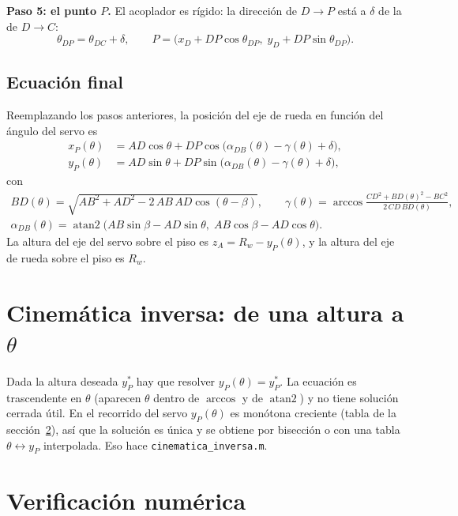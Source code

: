 \documentclass[11pt,a4paper]{article}
\newcommand{\atan}{\operatorname{atan2}}
\begin{document}
\textbf{Paso 5: el punto \(P\).} El acoplador es rígido: la dirección de \(D\!\to\!P\) está a \(\delta\)
de la de \(D\!\to\!C\):
\begin{equation}
\theta_{DP}=\theta_{DC}+\delta,\qquad
P=\bigl(x_D+DP\cos\theta_{DP},\;y_D+DP\sin\theta_{DP}\bigr).
\end{equation}

\subsection*{Ecuación final}

Reemplazando los pasos anteriores, la posición del eje de rueda en función del ángulo del servo es
\begin{equation}
\boxed{\;
\begin{aligned}
x_P(\theta)&=AD\cos\theta+DP\cos\bigl(\alpha_{DB}(\theta)-\gamma(\theta)+\delta\bigr),\\[2pt]
y_P(\theta)&=AD\sin\theta+DP\sin\bigl(\alpha_{DB}(\theta)-\gamma(\theta)+\delta\bigr),
\end{aligned}\;}
\label{eq:final}
\end{equation}
con
\begin{gather}
BD(\theta)=\sqrt{AB^2+AD^2-2\,AB\,AD\cos(\theta-\beta)},\qquad
\gamma(\theta)=\arccos\frac{CD^2+BD(\theta)^2-BC^2}{2\,CD\,BD(\theta)},\\[2pt]
\alpha_{DB}(\theta)=\atan\!\bigl(AB\sin\beta-AD\sin\theta,\;AB\cos\beta-AD\cos\theta\bigr).
\end{gather}
La altura del eje del servo sobre el piso es \(z_A=R_w-y_P(\theta)\), y la altura del eje de rueda
sobre el piso es \(R_w\).

\section{Cinemática inversa: de una altura a \(\theta\)}

Dada la altura deseada \(y_P^{*}\) hay que resolver \(y_P(\theta)=y_P^{*}\). La ecuación es
trascendente en \(\theta\) (aparecen \(\theta\) dentro de \(\arccos\) y de \(\atan\)) y no tiene
solución cerrada útil. En el recorrido del servo \(y_P(\theta)\) es monótona creciente (tabla de la
sección~\ref{sec:num}), así que la solución es única y se obtiene por bisección o con una tabla
\(\theta\leftrightarrow y_P\) interpolada. Eso hace \texttt{cinematica\_inversa.m}.

\section{Verificación numérica}\label{sec:num}
\end{document}
